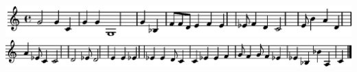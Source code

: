 \includegraphics{M-2-ts-50-nit-50-fw-pom.pkl-1}%
\ifx\betweenLilyPondSystem \undefined
  \linebreak
\else
  \expandafter{}%
\fi
\includegraphics{M-2-ts-50-nit-50-fw-pom.pkl-2}%
